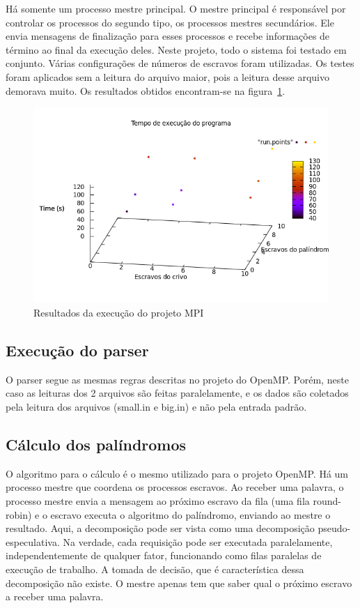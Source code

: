 \documentclass[a4paper]{article}
\begin{document}
\indent \indent Há somente um processo mestre principal. O mestre principal é responsável por controlar os processos do segundo tipo, os processos mestres secundários. Ele envia mensagens de finalização para esses processos e recebe informações de término ao final da execução deles. Neste projeto, todo o sistema foi testado em conjunto. Várias configurações de números de escravos foram utilizadas. Os testes foram aplicados sem a leitura do arquivo maior, pois a leitura desse arquivo demorava muito. Os resultados obtidos encontram-se na figura~\ref{graph-mpi}.
\begin{figure}[float=p]
	\includegraphics[scale=0.5]{graph-mpi}
	\caption{Resultados da execução do projeto MPI}
	\label{graph-mpi}
\end{figure}

\subsection{Execução do parser}
\indent \indent O parser segue as mesmas regras descritas no projeto do OpenMP. Porém, neste caso as leituras dos 2 arquivos são feitas paralelamente, e os dados são coletados pela leitura dos arquivos (small.in e big.in) e não pela entrada padrão.

\subsection{Cálculo dos palíndromos}
\indent \indent O algoritmo para o cálculo é o mesmo utilizado para o projeto OpenMP. Há um processo mestre que coordena os processos escravos. Ao receber uma palavra, o processo mestre envia a mensagem ao próximo escravo da fila (uma fila round-robin) e o escravo executa o algoritmo do palíndromo, enviando ao mestre o resultado. Aqui, a decomposição pode ser vista como uma decomposição pseudo-especulativa. Na verdade, cada requisição pode ser executada paralelamente, independentemente de qualquer fator, funcionando como filas paralelas de execução de trabalho. A tomada de decisão, que é característica dessa decomposição não existe. O mestre apenas tem que saber qual o próximo escravo a receber uma palavra.
\end{document}
